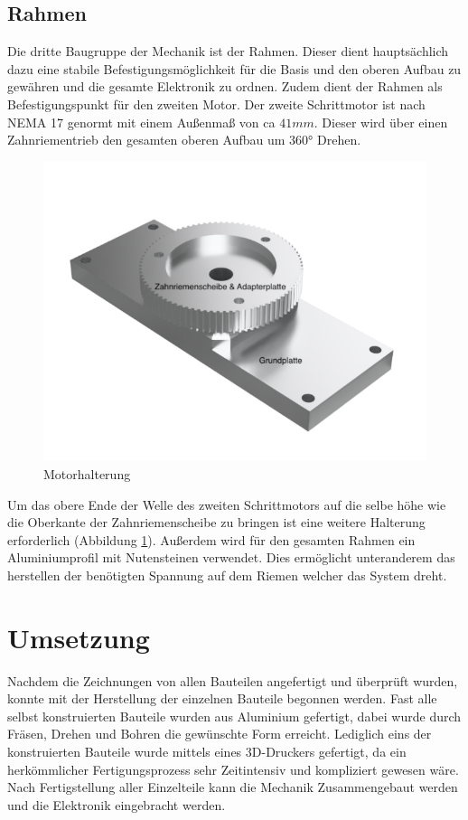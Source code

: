 \subsection{Rahmen}
Die dritte Baugruppe der Mechanik ist der Rahmen. Dieser dient hauptsächlich dazu eine stabile Befestigungsmöglichkeit für die Basis und den oberen Aufbau zu gewähren und die gesamte Elektronik zu ordnen. Zudem dient der Rahmen als Befestigungspunkt für den zweiten Motor. Der zweite Schrittmotor ist nach \ac{NEMA} 17 genormt mit einem Außenmaß von ca $41mm$. Dieser wird über einen Zahnriementrieb den gesamten oberen Aufbau um 360° Drehen. 
\begin{figure}[H]
	\centering
	\includegraphics[width=\textwidth]{images/Mechanik/Basis}
	\caption{Motorhalterung}
	\label{motorhalterung}
\end{figure}
Um das obere Ende der Welle des zweiten Schrittmotors auf die selbe höhe wie die Oberkante der Zahnriemenscheibe zu bringen ist eine weitere Halterung erforderlich (Abbildung \ref{motorhalterung}). Außerdem wird für den gesamten Rahmen ein Aluminiumprofil mit Nutensteinen verwendet. Dies ermöglicht unteranderem das herstellen der benötigten Spannung auf dem Riemen welcher das System dreht. 
\section{Umsetzung}
Nachdem die Zeichnungen von allen Bauteilen angefertigt und überprüft wurden, konnte mit der Herstellung der einzelnen Bauteile begonnen werden. Fast alle selbst konstruierten Bauteile wurden aus Aluminium gefertigt, dabei wurde durch Fräsen, Drehen und Bohren die gewünschte Form erreicht. Lediglich eins der konstruierten Bauteile wurde mittels eines 3D-Druckers gefertigt, da ein herkömmlicher Fertigungsprozess sehr Zeitintensiv und kompliziert gewesen wäre. Nach Fertigstellung aller Einzelteile kann die Mechanik Zusammengebaut werden und die Elektronik eingebracht werden.